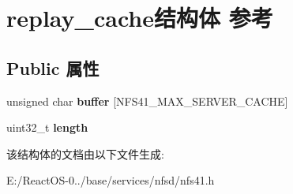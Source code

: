 \hypertarget{structreplay__cache}{}\section{replay\+\_\+cache结构体 参考}
\label{structreplay__cache}
\subsection*{Public 属性}
\begin{DoxyCompactItemize}
\item 
\mbox{\label{structreplay__cache_aa27a3d105a5e9c6890cbdac2134132dc}} 
unsigned char {\bfseries buffer} \mbox{[}N\+F\+S41\+\_\+\+M\+A\+X\+\_\+\+S\+E\+R\+V\+E\+R\+\_\+\+C\+A\+C\+HE\mbox{]}
\item 
\mbox{\label{structreplay__cache_a72bf73df6765396ef975e009bf873d15}} 
uint32\+\_\+t {\bfseries length}
\end{DoxyCompactItemize}


该结构体的文档由以下文件生成\+:\begin{DoxyCompactItemize}
\item 
E\+:/\+React\+O\+S-\/0../base/services/nfsd/nfs41.\+h\end{DoxyCompactItemize}

